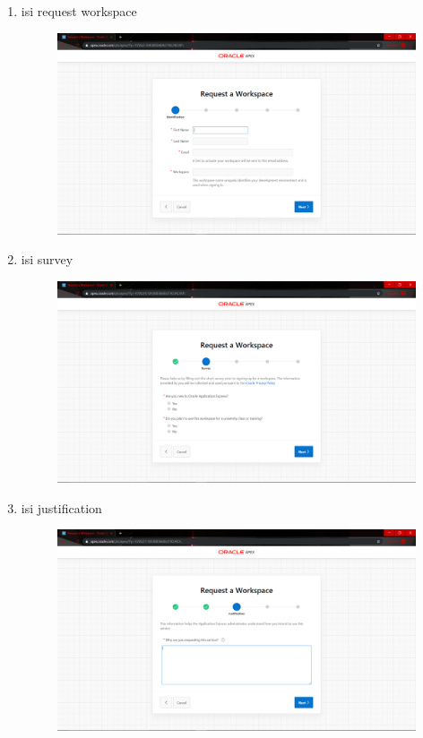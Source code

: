 \begin{enumerate}
\item isi request workspace
\begin{figure}[H]
        \centerline{\includegraphics[scale=0.1]{figures/3}}
        \caption{}
		\label{langkah2}
\end{figure}


\item isi survey

\begin{figure}[H]
    \centering
    \includegraphics[scale=0.1]{figures/4}
    \caption{}
    \label{Figureanaconda3}
\end{figure}


\item isi justification

\begin{figure}[H]
    \centering
    \includegraphics[scale=0.1]{figures/5}
    \caption{}
    \label{Figureanaconda4}
\end{figure}



\end{enumerate}

